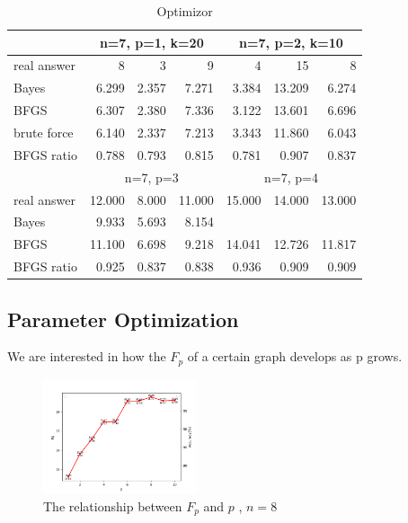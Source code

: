 \begin{table}[htbp]
  \centering
  \caption{Optimizor}
    \begin{tabular}{lrrrrrr}
\toprule
          & \multicolumn{3}{c}{n=7, p=1, k=20} & \multicolumn{3}{c}{n=7, p=2, k=10} \\
\midrule
    real answer & 8     & 3     & 9     & 4     & 15    & 8 \\
    Bayes  & 6.299  & 2.357  & 7.271  & 3.384  & 13.209  & 6.274  \\
    BFGS  & 6.307  & 2.380  & 7.336  & 3.122  & 13.601  & 6.696  \\
    brute force & 6.140  & 2.337  & 7.213  & 3.343  & 11.860  & 6.043  \\
    BFGS ratio & 0.788  & 0.793  & 0.815  & 0.781  & 0.907  & 0.837  \\
\midrule
          & \multicolumn{3}{c}{n=7, p=3} & \multicolumn{3}{c}{n=7, p=4} \\
\midrule
    real answer & 12.000  & 8.000  & 11.000  & 15.000  & 14.000  & 13.000  \\
    Bayes  & 9.933  & 5.693  & 8.154  &       &       &  \\
    BFGS  & 11.100  & 6.698  & 9.218  & 14.041  & 12.726  & 11.817  \\
    BFGS ratio & 0.925  & 0.837  & 0.838  & 0.936  & 0.909  & 0.909  \\
\bottomrule
    \end{tabular}%
   \label{tab:Opt}%
\end{table}%

\subsection{Parameter Optimization}
We are interested in how the $F_p$ of a certain graph develops as p grows.

\begin{figure}[!htb]
    \centering
        \includegraphics[width=0.4\textwidth]{pic/result_8.png}
        \caption{The relationship between $F_p$ and $p$ , $n=8$}
    \label{fig:result_8}
\end{figure}

